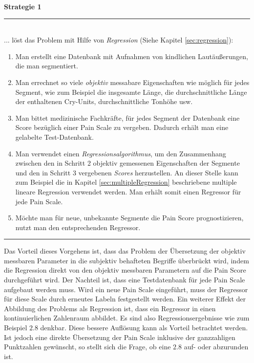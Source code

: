 \textbf{Strategie 1} \noindent\rule{0.83\linewidth}{0.3pt}\\
... löst das Problem mit Hilfe von \emph{Regression} (Siehe Kapitel \ref{sec:regression}):
\begin{enumerate}
 \item Man erstellt eine Datenbank mit Aufnahmen von kindlichen Lautäußerungen, die man segmentiert.
 \item Man errechnet \glqq so viele \emph{objektiv} messabare Eigenschaften wie möglich\grqq{} für jedes Segment, wie zum Beispiel die insgesamte Länge, die durchschnittliche Länge der enthaltenen Cry-Units, durchschnittliche Tonhöhe usw.
 \item Man bittet medizinische Fachkräfte, für jedes Segment der Datenbank eine Score bezüglich einer Pain Scale zu vergeben. Dadurch erhält man eine gelabelte Test-Datenbank.
 \item Man verwendet einen \emph{Regressionsalgorithmus}, um den Zusammenhang zwischen den in Schritt 2 objektiv gemessenen Eigenschaften der Segmente und den in Schritt 3 vergebenen \emph{Scores} herzustellen. An dieser Stelle kann zum Beispiel die in Kapitel \ref{sec:multipleRegression} beschriebene multiple lineare Regression verwendet werden. Man erhält somit einen Regressor für jede Pain Scale.
 \item Möchte man für neue, unbekannte Segmente die Pain Score prognostizieren, nutzt man den entsprechenden Regressor.
\end{enumerate}
\noindent\rule{\linewidth}{0.3pt}

Das Vorteil dieses Vorgehens ist, dass das Problem der Übersetzung der objektiv messbaren Parameter in die subjektiv behafteten Begriffe überbrückt wird, indem die Regression direkt von den objektiv messbaren Parametern auf  die Pain Score durchgeführt wird. Der Nachteil ist, dass eine Testdatenbank für jede Pain Scale aufgebaut werden muss. Wird ein neue Pain Scale eingeführt, muss der Regressor für diese Scale durch erneutes Labeln festgestellt werden. Ein weiterer Effekt der Abbildung des Problems als Regression ist, dass ein Regressor in einen kontinuierlichen Zahlenraum abbildet. Es sind also Regressionsergebnisse wie zum Beispiel $2.8$ denkbar. Diese \glqq bessere Auflösung\grqq{} kann als Vorteil betrachtet werden. Ist jedoch eine direkte Übersetzung der Pain Scale inklusive der ganzzahligen Punktzahlen gewünscht, so stellt sich die Frage, ob eine $2.8$ auf- oder abzurunden ist.

\vspace{5mm}

